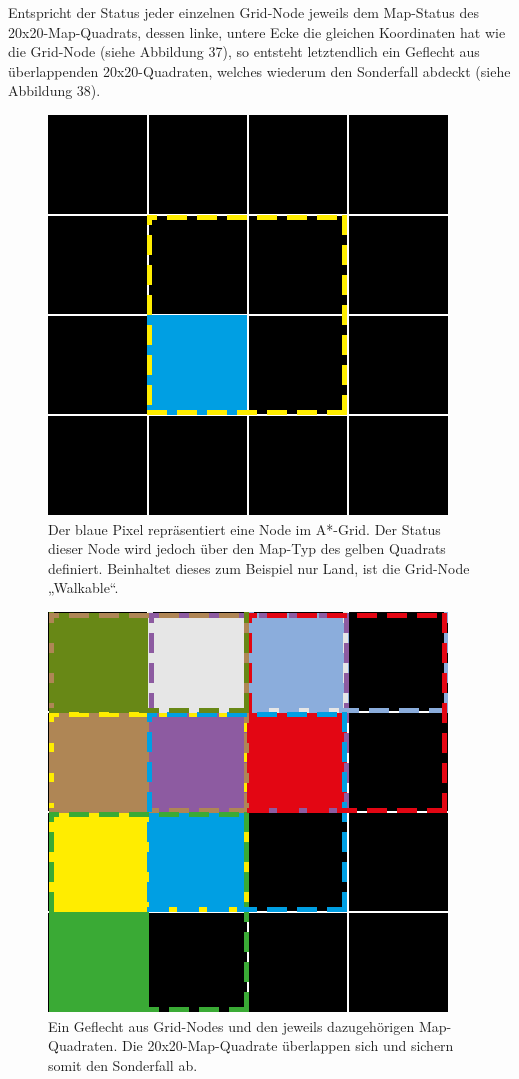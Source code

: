 \documentclass[a4paper,12pt]{article}
\begin{document}
Entspricht der Status jeder einzelnen Grid-Node jeweils dem Map-Status des 20x20-Map-Quadrats, dessen linke, untere Ecke die gleichen Koordinaten hat wie die Grid-Node (siehe Abbildung 37), so entsteht letztendlich ein Geflecht aus überlappenden 20x20-Quadraten, welches wiederum den Sonderfall abdeckt (siehe Abbildung 38).

\begin{figure}[H]
\centering
    \includegraphics[width=.8\linewidth]{Bilder/Aufgabe3/AStar_Grid.png}
    \caption{Der blaue Pixel repräsentiert eine Node im A*-Grid. Der Status dieser Node wird jedoch über den Map-Typ des gelben Quadrats definiert. Beinhaltet dieses zum Beispiel nur Land, ist die Grid-Node „Walkable“.}
\end{figure}

\begin{figure}[H]
\centering
    \includegraphics[width=.8\linewidth]{Bilder/Aufgabe3/AStar_Grid_02.png}
    \caption{Ein Geflecht aus Grid-Nodes und den jeweils dazugehörigen Map-Quadraten. Die 20x20-Map-Quadrate überlappen sich und sichern somit den Sonderfall ab.}
\end{figure}
\end{document}
